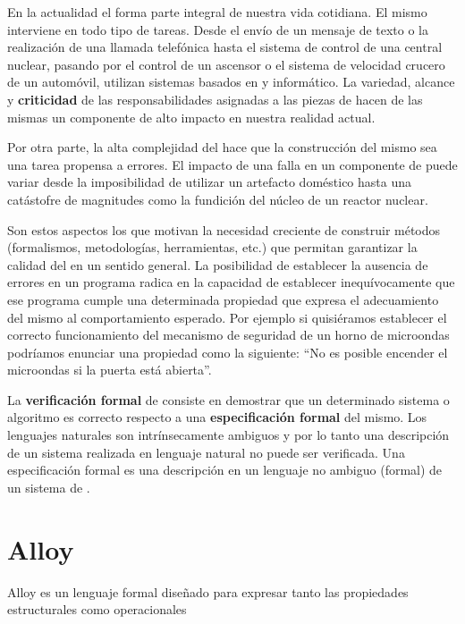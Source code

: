 En la actualidad el \soft forma parte integral de nuestra vida cotidiana. El
mismo interviene en todo tipo de tareas. Desde el envío de un mensaje de texto o
la realización de una llamada telefónica hasta el sistema de control de una
central nuclear, pasando por el control de un ascensor o el sistema de velocidad
crucero de un automóvil, utilizan sistemas basados en \hard y \soft
informático. La variedad, alcance y \textbf{criticidad} de las responsabilidades
asignadas a las piezas de \soft hacen de las mismas un componente de alto
impacto en nuestra realidad actual. 

Por otra parte, la alta complejidad del \soft hace que la construcción del mismo
sea una tarea propensa a errores. El impacto de una falla en un componente de
\soft puede variar desde la imposibilidad de utilizar un artefacto doméstico
hasta una catástofre de magnitudes como la fundición del núcleo de un reactor
nuclear. 

Son estos aspectos los que motivan la necesidad creciente de construir métodos
(formalismos, metodologías, herramientas, etc.) que permitan garantizar la
calidad del \soft en un sentido general. La posibilidad de establecer la
ausencia de errores en un programa radica en la capacidad de establecer
inequívocamente que ese programa cumple una determinada propiedad que expresa
el adecuamiento del mismo al comportamiento esperado.
Por ejemplo si quisiéramos establecer el correcto  funcionamiento del
mecanismo de seguridad de un horno de microondas podríamos enunciar una
propiedad como la siguiente: ``No es posible encender el
microondas si la puerta está abierta''. 

La \textbf{verificación formal} de \soft consiste en demostrar que un
determinado sistema o algoritmo es correcto respecto a una
\textbf{especificación formal} del mismo. Los lenguajes naturales son
intrínsecamente ambiguos y por lo tanto una descripción de un sistema realizada
en lenguaje natural no puede ser verificada. Una especificación formal es una
descripción en un lenguaje no ambiguo (formal) de un sistema de \soft.

\section{Alloy}

Alloy \cite{jackson:acmtosem-11_2} es un lenguaje formal diseñado para expresar
tanto las propiedades estructurales como operacionales
